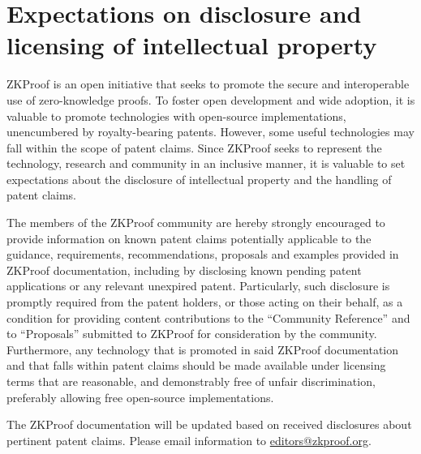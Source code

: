 \section*{\centering Expectations on disclosure and licensing of intellectual property}

	ZKProof is an open initiative that seeks to promote the secure and interoperable use of zero-knowledge proofs. 
	To foster open development and wide adoption, it is valuable to promote technologies with open-source implementations, unencumbered by royalty-bearing patents.
	However, some useful technologies may fall within the scope of patent claims. Since ZKProof seeks to represent the technology, research and community in an inclusive manner, it is  
valuable to set expectations about the disclosure of intellectual property and the handling of patent claims.


	The members of the ZKProof community are hereby strongly encouraged to provide information on known patent claims potentially applicable to the guidance, requirements, recommendations, proposals and examples provided in ZKProof documentation, including by disclosing known pending patent applications or any relevant unexpired patent.
	Particularly, such disclosure is promptly required from the patent holders, or those acting on their behalf, as a condition for providing content contributions to the ``Community Reference'' and to ``Proposals'' submitted to ZKProof for consideration by the community.
	Furthermore, any technology that is promoted in said ZKProof documentation and that falls within patent claims should be made available under licensing terms that are reasonable, and demonstrably free of unfair discrimination, preferably allowing free open-source implementations.
\loosen

	The ZKProof documentation will be updated based on received disclosures about pertinent patent claims.
	Please email information to \href{mailto:editors@zkproof.org}{editors@zkproof.org}.
